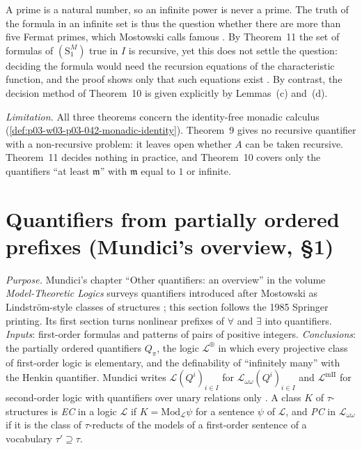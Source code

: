 A prime is a natural number, so an infinite power is never a prime.  The
truth of the formula in an infinite set is thus the question whether
there are more than five Fermat primes, which Mostowski calls famous
\cite[p.~35]{Mostowski1957}.  By Theorem~11 the set of formulas of
\((\mathrm S^M_1)\) true in \(I\) is recursive, yet this does not settle
the question: deciding the formula would need the recursion equations of
the characteristic function, and the proof shows only that such equations
exist \cite[p.~35]{Mostowski1957}.  By contrast, the decision method of
Theorem~10 is given explicitly by Lemmas~(c) and~(d).

\emph{Limitation.}  All three theorems concern the identity-free monadic
calculus (\cref{def:p03-w03-p03-042-monadic-identity}).  Theorem~9 gives
no recursive quantifier with a non-recursive problem: it leaves open
whether \(A\) can be taken recursive.  Theorem~11 decides nothing in
practice, and Theorem~10 covers only the quantifiers ``at least
\(\mathfrak m\)'' with \(\mathfrak m\) equal to \(1\) or infinite.


\section{Quantifiers from partially ordered prefixes (Mundici's overview, \S1)}
\label{sec:p03-w03-p03-042-mundici-po}

\emph{Purpose.}  Mundici's chapter ``Other quantifiers: an overview'' in
the volume \emph{Model-Theoretic Logics} surveys quantifiers introduced
after Mostowski as Lindstr\"om-style classes of structures
\cite[p.~211]{Mundici1985OtherQuantifiers}; this section follows the 1985
Springer printing.  Its first section turns nonlinear prefixes of
\(\forall\) and \(\exists\) into quantifiers.  \emph{Inputs}: first-order
formulas and patterns of pairs of positive integers.
\emph{Conclusions}: the partially ordered quantifiers \(Q_\pi\), the
logic \(\mathscr L^{\circledR}\) in which every projective class of
first-order logic is elementary, and the definability of ``infinitely
many'' with the Henkin quantifier.  Mundici writes \(\mathscr L(Q^i)_{i\in
I}\) for \(\mathscr L_{\omega\omega}(Q^i)_{i\in I}\) and
\(\mathscr L^{\mathrm{mII}}\) for second-order logic with quantifiers over
unary relations only \cite[p.~211]{Mundici1985OtherQuantifiers}.  A class
\(K\) of \(\tau\)-structures is \emph{EC} in a logic \(\mathscr L\) if
\(K=\mathrm{Mod}_{\mathscr L}\psi\) for a sentence \(\psi\) of
\(\mathscr L\), and \emph{PC} in \(\mathscr L_{\omega\omega}\) if it is the
class of \(\tau\)-reducts of the models of a first-order sentence of a
vocabulary \(\tau'\supseteq\tau\).

